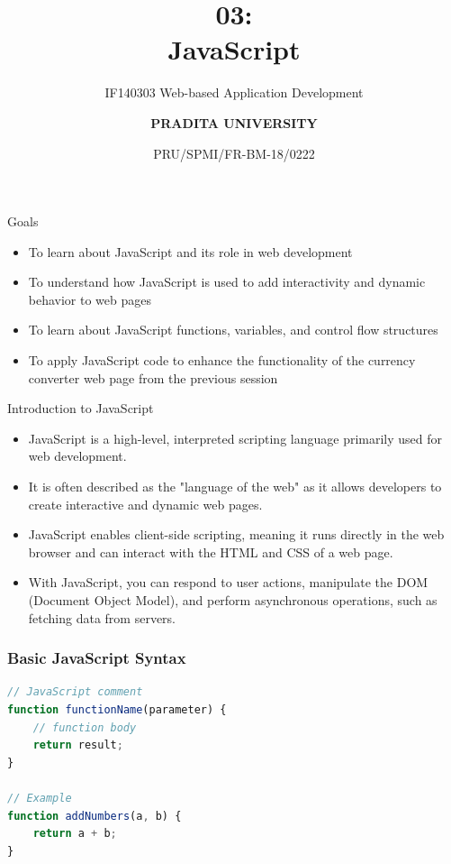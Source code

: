 \documentclass[aspectratio=169, table]{beamer}
\subtitle{IF140303 Web-based Application Development}
\title{\Huge {\textbf{03: \\JavaScript}}}
\date[Serial]{\scriptsize {PRU/SPMI/FR-BM-18/0222}}
\author[Pradita]{\small {\textbf{PRADITA UNIVERSITY}}}
\begin{document}
\begin{frame}
    \titlepage
\end{frame}

\begin{frame}{Goals}
    \vskip-1cm
    \begin{itemize}
        \item To learn about JavaScript and its role in web development
        \item To understand how JavaScript is used to add interactivity and dynamic behavior to web pages
        \item To learn about JavaScript functions, variables, and control flow structures
        \item To apply JavaScript code to enhance the functionality of the currency converter web page from the previous session
    \end{itemize}
\end{frame}

\begin{frame}{Introduction to JavaScript}
    \vskip-0.5cm
    \begin{itemize}
        \item JavaScript is a high-level, interpreted scripting language primarily used for web development.
        \item It is often described as the "language of the web" as it allows developers to create interactive and dynamic web pages.
        \item JavaScript enables client-side scripting, meaning it runs directly in the web browser and can interact with the HTML and CSS of a web page.
        \item With JavaScript, you can respond to user actions, manipulate the DOM (Document Object Model), and perform asynchronous operations, such as fetching data from servers.
    \end{itemize}
\end{frame}

\begin{frame}[fragile] %
    \frametitle{Basic JavaScript Syntax}
    \vskip0.5cm
    \begin{lstlisting}[language=JavaScript]
// JavaScript comment
function functionName(parameter) {
    // function body
    return result;
}

// Example
function addNumbers(a, b) {
    return a + b;
}
    \end{lstlisting}
\end{frame}
\end{document}
